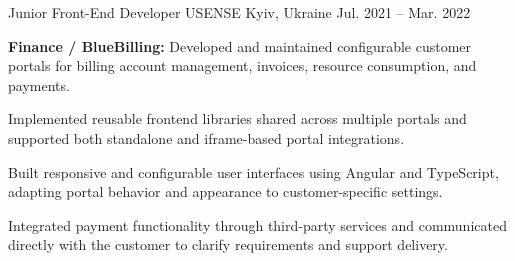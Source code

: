 \begin{cventries}
  \cventry
  {Junior Front-End Developer}
  {USENSE}
  {Kyiv, Ukraine}
  {Jul. 2021 -- Mar. 2022}
  {
    \begin{cvitems}
      \item {\textbf{Finance / BlueBilling:} Developed and maintained configurable customer portals for billing account management, invoices, resource consumption, and payments.}
      \item {Implemented reusable frontend libraries shared across multiple portals and supported both standalone and iframe-based portal integrations.}
      \item {Built responsive and configurable user interfaces using Angular and TypeScript, adapting portal behavior and appearance to customer-specific settings.}
      \item {Integrated payment functionality through third-party services and communicated directly with the customer to clarify requirements and support delivery.}
    \end{cvitems}
  }

\end{cventries}